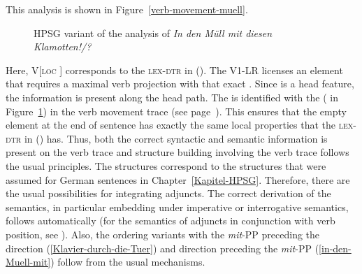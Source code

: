 \begin{exe}
\begin{xlist}[iv.]
\begin{exe}
\begin{xlist}[iv.]
This analysis is shown in Figure~\vref{verb-movement-muell}.
\begin{figure}
\caption{\label{verb-movement-muell}HPSG variant of the analysis of \emph{In den Müll mit diesen Klamotten!/?}}
\end{figure}%
Here, V[\textsc{loc} ] corresponds to the \textsc{lex-dtr} in (). The V1-LR licenses an element that requires a maximal verb projection
with that exact \dslv {}. Since \dsl is a head feature, the information is present along the head path. The \dslv is identified with the \localv
( in Figure~\ref{verb-movement-muell}) in the verb movement trace (see page~\pageref{le-verbspur}). 
This ensures that the empty element at the end of sentence has exactly the same local properties that the \textsc{lex-dtr} in () has.
Thus, both the correct syntactic and semantic information is present on the verb trace and structure
building involving the verb trace follows the usual principles.
The structures correspond to the structures that were assumed for German sentences in Chapter~\ref{Kapitel-HPSG}.
Therefore, there are the usual possibilities for integrating adjuncts. The correct derivation of the semantics, in particular embedding under
imperative or interrogative semantics, follows automatically (for the semantics of adjuncts in conjunction with verb position, see  ). 
Also, the ordering variants with the \emph{mit}-PP preceding the direction (\ref{Klavier-durch-die-Tuer}) and direction preceding the 
\emph{mit}-PP (\ref{in-den-Muell-mit}) follow from the usual mechanisms.


\end{xlist}
\end{exe}
\end{xlist}
\end{exe}
